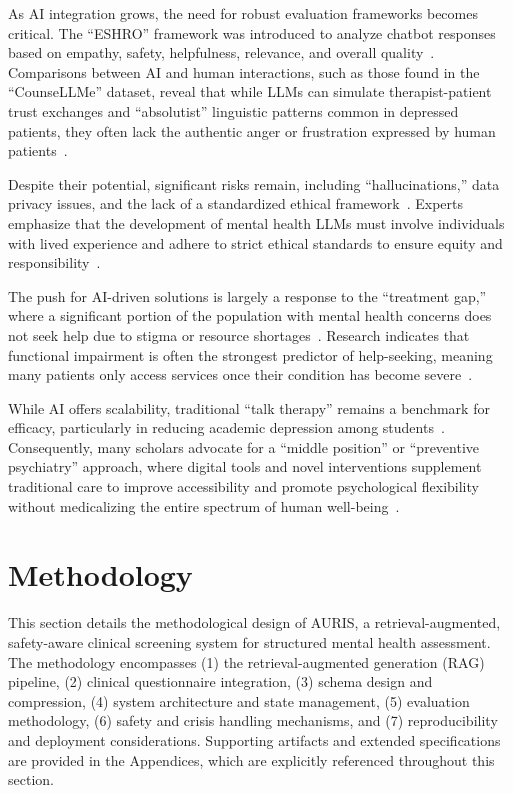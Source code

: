 \documentclass[sigconf]{acmart}
\begin{document}
As AI integration grows, the need for robust evaluation frameworks becomes critical. The ``ESHRO'' framework was introduced to analyze chatbot responses based on empathy, safety, helpfulness, relevance, and overall quality~\cite{sherwani_eshro_2025}. Comparisons between AI and human interactions, such as those found in the ``CounseLLMe'' dataset, reveal that while LLMs can simulate therapist-patient trust exchanges and ``absolutist'' linguistic patterns common in depressed patients, they often lack the authentic anger or frustration expressed by human patients~\cite{de_duro_introducing_2025}.

Despite their potential, significant risks remain, including ``hallucinations,'' data privacy issues, and the lack of a standardized ethical framework~\cite{lawrence_opportunities_2024}. Experts emphasize that the development of mental health LLMs must involve individuals with lived experience and adhere to strict ethical standards to ensure equity and responsibility~\cite{lawrence_opportunities_2024}.

The push for AI-driven solutions is largely a response to the ``treatment gap,'' where a significant portion of the population with mental health concerns does not seek help due to stigma or resource shortages~\cite{zhao_research_2025}. Research indicates that functional impairment is often the strongest predictor of help-seeking, meaning many patients only access services once their condition has become severe~\cite{zhao_research_2025}.

While AI offers scalability, traditional ``talk therapy'' remains a benchmark for efficacy, particularly in reducing academic depression among students~\cite{c_ncheke_efficacy_2024}. Consequently, many scholars advocate for a ``middle position'' or ``preventive psychiatry'' approach, where digital tools and novel interventions supplement traditional care to improve accessibility and promote psychological flexibility without medicalizing the entire spectrum of human well-being~\cite{wren-lewis_mental_2021,singh_mental_2022}.


\section{Methodology}

This section details the methodological design of AURIS, a retrieval-augmented, safety-aware clinical screening system for structured mental health assessment. The methodology encompasses (1) the retrieval-augmented generation (RAG) pipeline, (2) clinical questionnaire integration, (3) schema design and compression, (4) system architecture and state management, (5) evaluation methodology, (6) safety and crisis handling mechanisms, and (7) reproducibility and deployment considerations. Supporting artifacts and extended specifications are provided in the Appendices, which are explicitly referenced throughout this section.
\end{document}
